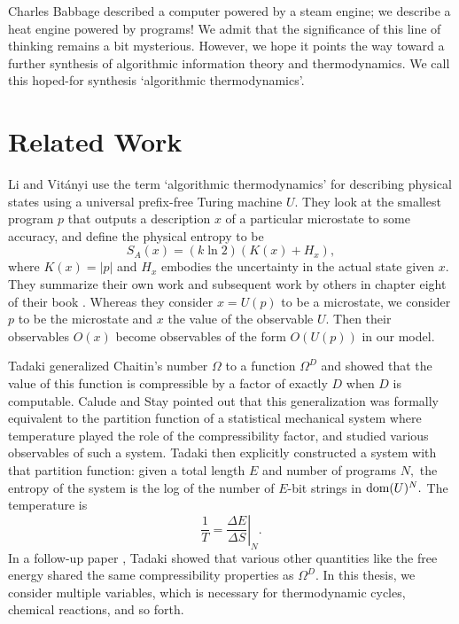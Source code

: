 \documentclass[12pt,twoside,openright]{report}
\newcommand{\dom}{\mbox{\rm dom}}
\begin{document}
Charles Babbage described a computer powered by a steam engine;
we describe a heat engine powered by programs!  We admit that the significance of this line of thinking remains a bit mysterious.  However, we hope it points the way toward a further synthesis of algorithmic information theory and thermodynamics. We call this hoped-for synthesis `algorithmic thermodynamics'.

\section{Related Work}

Li and Vit\'anyi use the term `algorithmic thermodynamics' for describing physical states using a universal prefix-free Turing machine $U$. They look at the smallest program $p$ that outputs a description $x$ of a particular microstate to some accuracy, and define the physical entropy to be
\[ S_A(x) = (k \ln 2)(K (x) + H_x), \]
where $K(x) = |p|$ and $H_x$ embodies the uncertainty in the actual state given $x$. They summarize their own work and subsequent work by others in chapter eight of their book \cite{LV}.  Whereas they consider $x=U(p)$ to be a microstate, we consider $p$ to be the microstate and $x$ the value of the observable $U$.  Then their observables $O(x)$ become observables of the form $O(U(p))$ in our model.
 
Tadaki \cite{Tadaki2002} generalized Chaitin's number $\Omega$ to a function 
$\Omega^D$ and showed that the value of this function is compressible by a factor of exactly $D$ when $D$ is computable. Calude and Stay \cite{CSNatural2006} pointed out that this generalization was formally equivalent to the partition function of a statistical mechanical system where temperature played the role of the compressibility factor, and studied various observables of such a system. Tadaki \cite{Tadaki2008} then explicitly constructed a system with that partition function: given a total length $E$ and number of programs
$N,$ the entropy of the system is the log of the number of $E$-bit strings in $\dom(U)^N.$  The temperature is
\[ \frac{1}{T} = \left.\frac{\Delta E}{\Delta S}\right|_N. \]
In a follow-up paper \cite{Tadaki2009}, Tadaki showed that various other quantities like the free energy shared the same compressibility properties as $\Omega^D$.  In this thesis, we consider multiple variables, which is necessary for thermodynamic cycles, chemical reactions, and so forth.
\end{document}

